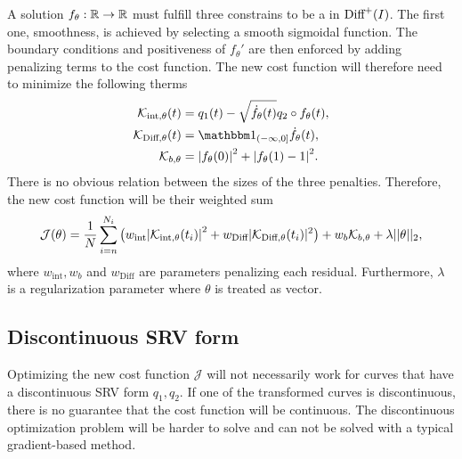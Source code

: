 A solution \(f_\theta : \mathbb{R} \rightarrow \mathbb{R} \) must fulfill three constrains to be a in \(\text{Diff}^+(I) \). The first one, smoothness, is achieved by selecting a smooth sigmoidal function. The boundary conditions and positiveness of \(f_\theta'\) are then enforced by adding penalizing terms to the cost function. The new cost function will therefore need to minimize the following therms
\begin{align*}
  \mathcal{K}_{\text{int},\theta}(t)&= q_1(t) - \sqrt{\dot f_\theta(t)}q_2 \circ f_\theta(t), \\
  \mathcal{K}_{\text{Diff},\theta}(t)&= \one_{(-\infty,0]}\dot f_{\theta}(t),\\
  \mathcal{K}_{b,\theta}&= \abs{f_\theta(0)}^2 + \abs{f_\theta(1) - 1}^2.
\end{align*}
There is no obvious relation between the sizes of the three penalties. Therefore, the new cost function will be their weighted sum 
\begin{equation}\label{eq:neural_cost}
  \mathcal{J}(\theta) = 
  \frac{1}{N}\sum_{i=n}^{N_i}{
    \big(
      w_\text{int}\abs{\mathcal{K}_{\text{int},\theta}(t_i)}^2 +
      w_{\text{Diff}}|{\mathcal{K}}_{\text{Diff}, \theta}(t_i)|^2
    \big)} + 
  w_{b}{\mathcal{K}}_{b,\theta} + 
  \lambda||\theta||_2,
\end{equation}
where  \(w_\text{int}, w_{b} \) and  \(w_{\text{Diff}}\) are parameters penalizing each residual. Furthermore, \(\lambda\) is a regularization parameter where \(\theta\) is treated as vector. 

\subsection{Discontinuous SRV form}\label{subsec:discont_curves}
Optimizing the new cost function \(\mathcal{J}\) will not necessarily work for curves that have a discontinuous SRV form \(q_1, q_2\). If one of the transformed curves is discontinuous, there is no guarantee that the cost function will be continuous. The discontinuous optimization problem will be harder to solve and can not be solved with a typical gradient-based method.

